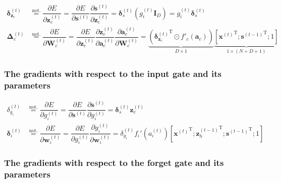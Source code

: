 \documentclass[11pt]{article}
\begin{document}
\begin{align}
  \boldsymbol{\delta}_{\boldsymbol{z}_c}^{(t)}
  & \overset{\text{not.}}{=}
    \dfrac{\partial E}{\partial \boldsymbol{z}_c^{(t)}} =
    \dfrac{\partial E}{\partial \boldsymbol{s}^{(t)}}
    \dfrac{\partial \boldsymbol{s}^{(t)}}{\partial \boldsymbol{z}_c^{(t)}} =
    \boldsymbol{\delta}_s^{(t)} \left(g_i^{(t)}\mathbf{I}_{D}\right)  =
     g_i^{(t)} \boldsymbol{\delta}_s^{(t)}
  \\
  \boldsymbol{\Delta}_{c}^{(t)}
  & \overset{\text{not.}}{=}
    \dfrac{\partial E}{\partial \boldsymbol{W}_{c}^{(t)}} =
    \dfrac{\partial E}{\partial \boldsymbol{z}_c^{(t)}}
    \dfrac{\partial \boldsymbol{z}_c^{(t)}}{\partial \boldsymbol{a}_c^{(t)}}
    \dfrac{\partial \boldsymbol{a}_c^{(t)}}{\partial \boldsymbol{W}_c^{(t)}} =
    \underbrace{\left({\boldsymbol{\delta}_{\mathbf{z}_c}^{(t)}}^{\text{T}} \odot f'_c\left(\mathbf{a}_c\right)\right)}_{D\times 1} \underbrace{\left[{\mathbf{x}^{(t)}}^{\text{T}}; {\mathbf{s}^{(t-1)}}^{\text{T}}; 1\right]}_{1 \times (N+D+1)}
\end{align}

\subsubsection*{The gradients with respect to the input gate and its parameters}

\begin{align}
  \delta_{g_{\iota}}^{(t)}
  & \overset{\text{not.}}{=}
    \dfrac{\partial E}{\partial g_{\iota}^{(t)}} =
    \dfrac{\partial E}{\partial \mathbf{s}^{(t)}}
    \dfrac{\partial \mathbf{s}^{(t)}}{\partial g_{\iota}^{(t)}} =
    \boldsymbol{\delta}_s^{(t)} \mathbf{z}_c^{(t)}
  \\
  \boldsymbol{\delta}_{\iota}^{(t)} &\overset{\text{not.}}{=} \dfrac{\partial E}{\partial \boldsymbol{w}_{\iota}^{(t)}} = \dfrac{\partial E}{\partial g_{\iota}^{(t)}} \dfrac{\partial g_{\iota}^{(t)}}{\partial \boldsymbol{w}_{\iota}^{(t)}} = \delta_{g_{\iota}}^{(t)} f_{\iota}'\left(a_{\iota}^{(t)}\right) \left[{\mathbf{x}^{(t)}}^{\text{T}}; {\mathbf{z}_{h}^{(t-1)}}^{\text{T}}; {\mathbf{s}^{(t-1)}}^{\text{T}}; 1\right]
\end{align}

\subsubsection*{The gradients with respect to the forget gate and its parameters}
\end{document}
